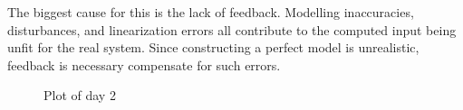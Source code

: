 The biggest cause for this is the lack of feedback. Modelling inaccuracies, disturbances, and linearization errors all contribute to the computed input being unfit for the real system. Since constructing a perfect model is unrealistic, feedback is necessary compensate for such errors.

\begin{figure}[htb]
    \centering
    \caption{Plot of day 2}
    \label{fig:day2_plot}
\end{figure}
